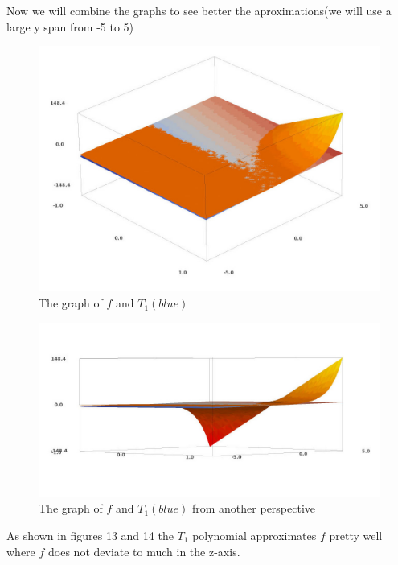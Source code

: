 \documentclass[a4paper,12pt]{article}
\begin{document}
\clearpage
Now we will combine the graphs to see better the aproximations(we will use a
large y span from -5 to 5)
\begin{figure}[H]
    \centering
    \includegraphics[scale=0.34]{3_f_t1_1.jpg}
    \caption{The graph of $f$ and $T_{1}(blue)$}
    \label{3_f_t1_1}
\end{figure}
\begin{figure}[H]
    \centering
    \includegraphics[scale=0.34]{3_f_t1_2.jpg}
    \caption{The graph of $f$ and $T_{1}(blue)$ from another perspective}
    \label{3_f_t1_2}
\end{figure}
As shown in figures 13 and 14 the $T_{1}$ polynomial approximates $f$ pretty
well where $f$ does not deviate to much in the z-axis.
\end{document}
